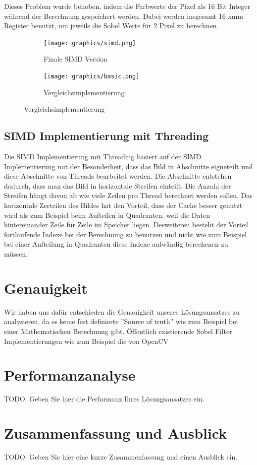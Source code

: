 \documentclass[course=erap]{aspdoc}
\begin{document}
Dieses Problem wurde behoben, indem die Farbwerte der Pixel als 16 Bit Integer während der Berechnung gespeichert werden.
Dabei werden insgesamt 16 xmm Register benutzt, um jeweils die Sobel Werte für 2 Pixel zu berechnen.
\begin{figure}[H]
    \begin{subfigure}{.5\columnwidth}
        \centering
        \texttt{[image: graphics/simd.png]}
        \caption{Finale SIMD Version}
        \label{fig:final-simd}
    \end{subfigure}
    \begin{subfigure}{.5\columnwidth}
        \centering
        \texttt{[image: graphics/basic.png]}
        \caption{Vergleichsimplementierung}
        \label{fig:vergleich}
    \end{subfigure}
\end{figure}

\subsection{SIMD Implementierung mit Threading}
Die SIMD Implementierung mit Threading basiert auf der SIMD Implementierung mit der Besonderheit, dass das Bild in Abschnitte eigneteilt und diese Abschnitte von Threads bearbeitet werden.
Die Abschnitte entstehen dadurch, dass man das Bild in horizontale Streifen einteilt. Die Anzahl der Streifen hängt davon ab wie viele Zeilen pro Thread berechnet werden sollen.
Das horizontale Zerteilen des Bildes hat den Vorteil, dass der Cache besser genutzt wird als zum Beispiel beim Aufteilen in Quadranten, weil die Daten hintereinander Zeile für Zeile im Speicher liegen.
Desweiteren besteht der Vorteil fortlaufende Indexe bei der Berechnung zu benutzen und nicht wie zum Beispiel bei einer Aufteilung in Quadranten diese Indexe aufwändig berechenen zu müssen.

\section{Genauigkeit}
Wir haben uns dafür entschieden die Genauigkeit unseres Lösungsansatzes zu analysieren, da es keine fest definierte ''Source of truth'' wie zum Beispiel bei einer Mathematischen Berechnung gibt.
Öffentlich existierende Sobel Filter Implementierungen wie zum Beispiel die von OpenCV
\section{Performanzanalyse}

TODO: Geben Sie hier die Performanz Ihres Lösungsansatzes ein.

\section{Zusammenfassung und Ausblick}

TODO: Geben Sie hier eine kurze Zusammenfassung und einen Ausblick ein.


{}
\end{document}

